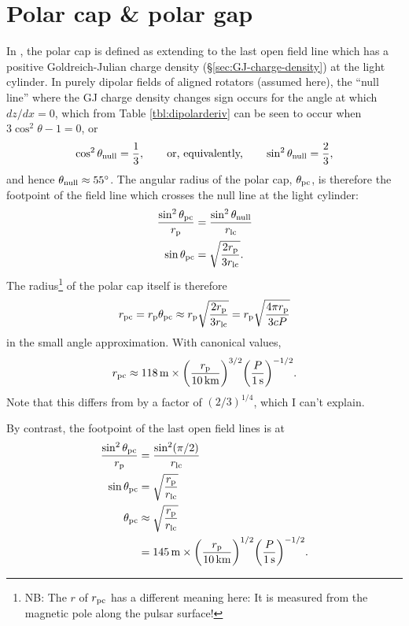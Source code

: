 \documentclass{book}
\newcommand{\rL}{r_\text{lc}} %
\newcommand{\rp}{r_\text{p}} %
\begin{document}
\section{Polar cap \& polar gap}

In \citet{Ruderman1975}, the polar cap is defined as extending to the last open field line which has a positive Goldreich-Julian charge density (\S\ref{sec:GJ-charge-density}) at the light cylinder.
In purely dipolar fields of aligned rotators (assumed here), the ``null line'' where the GJ charge density changes sign occurs for the angle at which $dz/dx = 0$, which from Table \ref{tbl:dipolarderiv} can be seen to occur when $3\cos^2\theta - 1 = 0$, or
\begin{equation}
    \cos^2 \theta_{\rm null} = \frac13,
    \qquad\text{or, equivalently,}\qquad
    \sin^2 \theta_{\rm null} = \frac23,
\end{equation}
and hence $\theta_{\rm null} \approx 55^\circ$.
The angular radius of the polar cap, $\theta_{\rm pc}$, is therefore the footpoint of the field line which crosses the null line at the light cylinder:
\begin{equation}
    \begin{aligned}
        \frac{\sin^2\theta_{\rm pc}}{\rp}
            &= \frac{\sin^2 \theta_{\rm null}}{\rL} \\
        \sin \theta_{\rm pc}
            &= \sqrt{\frac{2\rp}{3\rL}}.
    \end{aligned}
\end{equation}
The radius\footnote{NB: The $r$ of $r_{\rm pc}$ has a different meaning here: It is measured from the magnetic pole along the pulsar surface!} of the polar cap itself is therefore
\begin{equation}
    r_{\rm pc}
        = \rp\theta_{\rm pc}
        \approx \rp\sqrt{\frac{2\rp}{3\rL}}
        = \rp\sqrt{\frac{4\pi\rp}{3cP}}
\end{equation}
in the small angle approximation.
With canonical values,
\begin{equation}
    r_{\rm pc}
        \approx 118\,{\rm m} \times \bigg(\frac{\rp}{10\,{\rm km}}\bigg)^{3/2} \bigg(\frac{P}{1\,{\rm s}}\bigg)^{-1/2}.
\end{equation}
Note that this differs from \citet[][Eq. (4)]{Ruderman1975} by a factor of $(2/3)^{1/4}$, which I can't explain.

By contrast, the footpoint of the last open field lines is at
\begin{equation}
  \begin{aligned}
    \frac{\sin^2\theta_{\rm pc}}{\rp} &= \frac{\sin^2 (\pi/2)}{\rL} \\
    \sin\theta_{\rm pc} &= \sqrt{\frac{\rp}{\rL}} \\
    \theta_{\rm pc} &\approx \sqrt{\frac{\rp}{\rL}} \\
    &= 145\,{\rm m} \times \bigg(\frac{\rp}{10\,{\rm km}}\bigg)^{1/2} \bigg(\frac{P}{1\,{\rm s}}\bigg)^{-1/2}.
  \end{aligned}
\end{equation}
\end{document}
